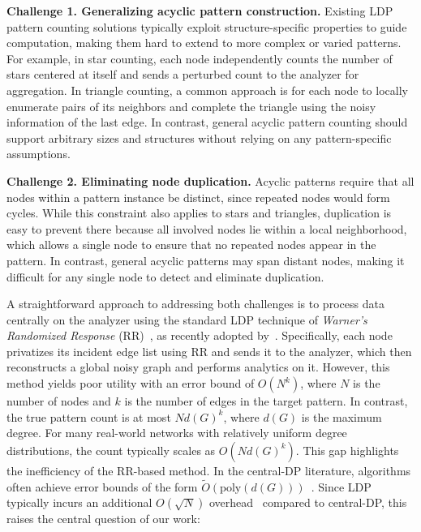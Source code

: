


\textbf{Challenge 1. Generalizing acyclic pattern construction.} 
Existing LDP pattern counting solutions typically exploit structure-specific properties to guide computation, making them hard to extend to more complex or varied patterns.
For example, in star counting, each node independently counts the number of stars centered at itself and sends a perturbed count to the analyzer for aggregation.
In triangle counting, a common approach is for each node to locally enumerate pairs of its neighbors and complete the triangle using the noisy information of the last edge.
In contrast, general acyclic pattern counting should support arbitrary sizes and structures without relying on any pattern-specific assumptions.



\textbf{Challenge 2. Eliminating node duplication.}  
Acyclic patterns require that all nodes within a pattern instance be distinct, since repeated nodes would form cycles.
While this constraint also applies to stars and triangles, duplication is easy to prevent there because all involved nodes lie within a local neighborhood, which allows a single node to ensure that no repeated nodes appear in the pattern. 
In contrast, general acyclic patterns may span distant nodes, making it difficult for any single node to detect and eliminate duplication.





A straightforward approach to addressing both challenges is to process data centrally on the analyzer using the standard LDP technique of \emph{Warner's Randomized Response} (RR)~\cite{warner1965randomized}, {as recently adopted by~\cite{suppakitpaisarn2025counting}}.
Specifically, each node privatizes its incident edge list using RR and sends it to the analyzer, which then reconstructs a global noisy graph and performs analytics on it.
However, this method yields poor utility with an error bound of {$O(N^k)$}, where $N$ is the number of nodes and $k$ is the number of edges in the target pattern. 
In contrast, the true pattern count is at most $N d(G)^k$, where $d(G)$ is the maximum degree. 
{For many real-world networks with relatively uniform degree distributions, the count typically scales as $O(N d(G)^k)$.
This gap highlights the inefficiency of the RR-based method.
In the central-DP literature, algorithms often achieve error bounds of the form $\tilde{O}(\mathrm{poly}(d(G)))$~\cite{johnson2018towards}.
Since LDP typically incurs an additional $O(\sqrt{N})$ overhead~\cite{bonawitz2017practical} compared to central-DP, this raises the central question of our work:}


